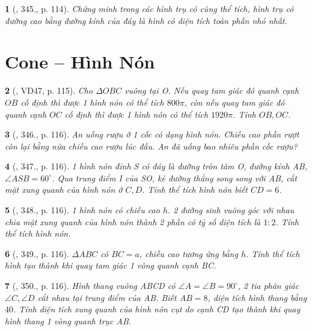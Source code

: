 \documentclass{article}
\newtheorem{baitoan}{}
\begin{document}
\begin{baitoan}[\cite{Binh_Toan_9_tap_2}, 345., p. 114]
	Chứng minh trong các hình trụ có cùng thể tích, hình trụ có đường cao bằng đường kính của đáy là hình có diện tích toàn phần nhỏ nhất.
\end{baitoan}


\section{Cone -- Hình Nón}

\begin{baitoan}[\cite{Binh_Toan_9_tap_2}, VD47, p. 115]
	Cho $\Delta OBC$ vuông tại O. Nếu quay tam giác đó quanh cạnh $OB$ cố định thì được 1 hình nón có thể tích $800\pi$, còn nếu quay tam giác đó quanh cạnh $OC$ cố định thì được 1 hình nón có thể tích $1920\pi$. Tính $OB,OC$.
\end{baitoan}

\begin{baitoan}[\cite{Binh_Toan_9_tap_2}, 346., p. 116]
	An uống rượu ở 1 cốc có dạng hình nón. Chiều cao phần rượt còn lại bằng nửa chiều cao rượu lúc đầu. An đã uống bao nhiêu phần cốc rượu?
\end{baitoan}

\begin{baitoan}[\cite{Binh_Toan_9_tap_2}, 347., p. 116]
	1 hình nón đỉnh S có đáy là đường tròn tâm O, đường kính AB, $\angle ASB = 60^\circ$. Qua trung điểm I của SO, kẻ đường thẳng song song với AB, cắt mặt xung quanh của hình nón ở $C,D$. Tính thể tích hình nón biết $CD = 6$.
\end{baitoan}

\begin{baitoan}[\cite{Binh_Toan_9_tap_2}, 348., p. 116]
	1 hình nón có chiều cao $h$. 2 đường sinh vuông góc với nhau chia mặt xung quanh của hình nón thành 2 phần có tỷ số diện tích là $1:2$. Tính thể tích hình nón.
\end{baitoan}

\begin{baitoan}[\cite{Binh_Toan_9_tap_2}, 349., p. 116]
	$\Delta ABC$ có $BC = a$, chiều cao tương ứng bằng $h$. Tính thể tích hình tạo thành khi quay tam giác 1 vòng quanh cạnh BC.
\end{baitoan}

\begin{baitoan}[\cite{Binh_Toan_9_tap_2}, 350., p. 116]
	Hình thang vuông ABCD có $\angle A = \angle B = 90^\circ$, 2 tia phân giác $\angle C,\angle D$ cắt nhau tại trung điểm của AB. Biết $AB = 8$, diện tích hình thang bằng $40$. Tính diện tích xung quanh của hình nón cụt do cạnh CD tạo thành khi quay hình thang 1 vòng quanh trục AB.
\end{baitoan}
\end{document}
